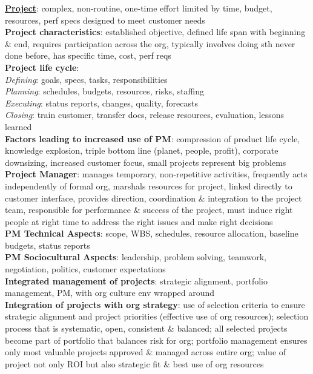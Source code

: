\documentclass[a4paper]{article}
\begin{document}
    \begin{multicols}{3}
        \tiny
        \noindent\underline{\textbf{Project}}: complex, non-routine, one-time effort limited by time, budget, resources, perf specs designed to meet customer needs\\
        \textbf{Project characteristics}: established objective, defined life span with beginning \& end, requires participation across the org, typically involves doing sth never done before, has specific time, cost, perf reqs\\
        \textbf{Project life cycle}:\\
        \textit{Defining}: goals, specs, tasks, responsibilities\\
        \textit{Planning}: schedules, budgets, resources, risks, staffing\\
        \textit{Executing}: status reports, changes, quality, forecasts\\
        \textit{Closing}: train customer, transfer docs, release resources, evaluation, lessons learned\\
        \textbf{Factors leading to increased use of PM}: compression of product life cycle, knowledge explosion, triple bottom line (planet, people, profit), corporate downsizing, increased customer focus, small projects represent big problems\\
        \textbf{Project Manager}: manages temporary, non-repetitive activities, frequently acts independently of formal org, marshals resources for project, linked directly to customer interface, provides direction, coordination \& integration to the project team, responsible for performance \& success of the project, must induce right people at right time to address the right issues and make right decisions\\
        \textbf{PM Technical Aspects}: scope, WBS, schedules, resource allocation, baseline budgets, status reports\\
        \textbf{PM Sociocultural Aspects}: leadership, problem solving, teamwork, negotiation, politics, customer expectations\\
        \textbf{Integrated management of projects}: strategic alignment, portfolio management, PM, with org culture env wrapped around\\
        \textbf{Integration of projects with org strategy}: use of selection criteria to ensure strategic alignment and project priorities (effective use of org resources); selection process that is systematic, open, consistent \& balanced; all selected projects become part of portfolio that balances risk for org; portfolio management ensures only most valuable projects approved \& managed across entire org; value of project not only ROI but also strategic fit \& best use of org resources\\

\end{multicols}
\end{document}
